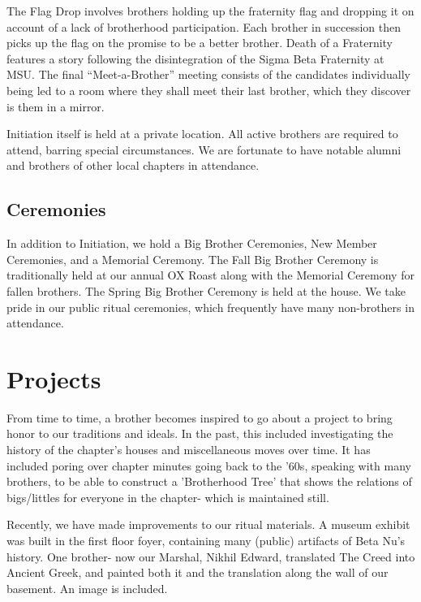       The Flag Drop involves brothers holding up the fraternity flag and dropping it on account of a lack of brotherhood participation. Each brother in succession then picks up the flag on the promise to be a better brother. Death of a Fraternity features a story following the disintegration of the Sigma Beta Fraternity at MSU. The final ``Meet-a-Brother'' meeting consists  of the candidates individually being led to a room where they shall meet their last brother, which they discover is them in a mirror.
      
      Initiation itself is held at a private location. All active brothers are required to attend, barring special circumstances. We are fortunate to have notable alumni and brothers of other local chapters in attendance. 
      
    \subsection*{Ceremonies}
    In addition to Initiation, we hold a Big Brother Ceremonies, New Member Ceremonies, and a Memorial Ceremony. The Fall Big Brother Ceremony is traditionally held at our annual OX Roast along with the Memorial Ceremony for fallen brothers. The Spring Big Brother Ceremony is held at the house. We take pride in our public ritual ceremonies, which frequently have many non-brothers in attendance. 
    
  \section*{Projects}
    From time to time, a brother becomes inspired to go about a project to bring honor to our traditions and ideals. In the past, this included investigating the history of the chapter's houses and miscellaneous moves over time. It has included poring over chapter minutes going back to the '60s, speaking with many brothers, to be able to construct a 'Brotherhood Tree' that shows the relations of bigs/littles for everyone in the chapter- which is maintained still.
    
    Recently, we have made improvements to our ritual materials. A museum exhibit was built in the first floor foyer, containing many (public) artifacts of Beta Nu's history. One brother- now our Marshal, Nikhil Edward, translated The Creed into Ancient Greek, and painted both it and the translation along the wall of our basement. An image is included. 